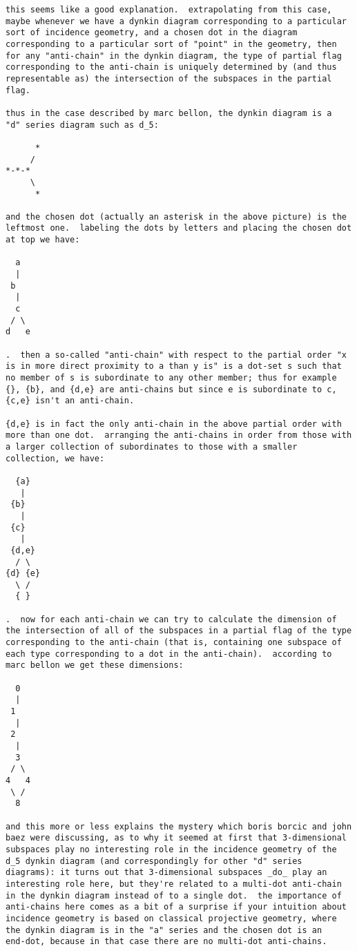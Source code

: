 \begin{verbatim}
this seems like a good explanation.  extrapolating from this case,
maybe whenever we have a dynkin diagram corresponding to a particular
sort of incidence geometry, and a chosen dot in the diagram
corresponding to a particular sort of "point" in the geometry, then
for any "anti-chain" in the dynkin diagram, the type of partial flag
corresponding to the anti-chain is uniquely determined by (and thus
representable as) the intersection of the subspaces in the partial
flag.

thus in the case described by marc bellon, the dynkin diagram is a
"d" series diagram such as d_5:

      *
     /
*-*-*
     \
      *

and the chosen dot (actually an asterisk in the above picture) is the
leftmost one.  labeling the dots by letters and placing the chosen dot
at top we have:

  a
  |
 b
  |
  c
 / \
d   e

.  then a so-called "anti-chain" with respect to the partial order "x
is in more direct proximity to a than y is" is a dot-set s such that
no member of s is subordinate to any other member; thus for example
{}, {b}, and {d,e} are anti-chains but since e is subordinate to c,
{c,e} isn't an anti-chain.

{d,e} is in fact the only anti-chain in the above partial order with
more than one dot.  arranging the anti-chains in order from those with
a larger collection of subordinates to those with a smaller
collection, we have:

  {a}
   |
 {b}
   |
 {c}
   |
 {d,e}
  / \
{d} {e}
  \ /
  { }

.  now for each anti-chain we can try to calculate the dimension of
the intersection of all of the subspaces in a partial flag of the type
corresponding to the anti-chain (that is, containing one subspace of
each type corresponding to a dot in the anti-chain).  according to
marc bellon we get these dimensions:

  0
  |
 1
  |
 2
  |
  3
 / \
4   4
 \ /
  8

and this more or less explains the mystery which boris borcic and john
baez were discussing, as to why it seemed at first that 3-dimensional
subspaces play no interesting role in the incidence geometry of the
d_5 dynkin diagram (and correspondingly for other "d" series
diagrams): it turns out that 3-dimensional subspaces _do_ play an
interesting role here, but they're related to a multi-dot anti-chain
in the dynkin diagram instead of to a single dot.  the importance of
anti-chains here comes as a bit of a surprise if your intuition about
incidence geometry is based on classical projective geometry, where
the dynkin diagram is in the "a" series and the chosen dot is an
end-dot, because in that case there are no multi-dot anti-chains.


\end{verbatim}
